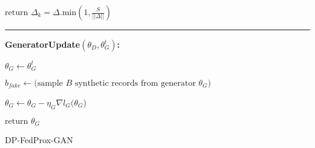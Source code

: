 \begin{algorithm}
$ \text{return }\Delta_{k}= \Delta .  \text{min}(1,\frac{S}{||\Delta|| }) $  
\BlankLine
\noindent\rule{8cm}{0.4pt}
\BlankLine
\textbf{GeneratorUpdate$(\theta_D, \theta^{t}_{G})$:}

$\theta_{G} \leftarrow \theta^{t}_{G}$ \;

 {
$b_{fake }  \leftarrow  \text{(sample $B$ synthetic records from generator $\theta_G$)}$\;

$\theta_G \leftarrow  \theta_G - \eta_G \nabla l_G (\theta_G$) 
}
	
$ \text{return } \theta_G$
\caption{DP-FedProx-GAN}
\label{alg:dpfedproxgan}
\end{algorithm} 
